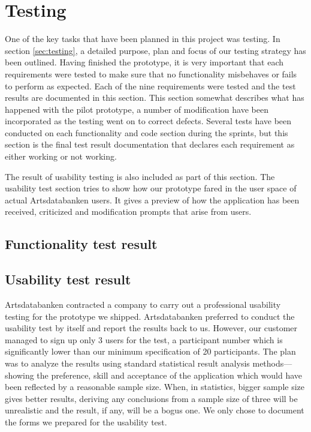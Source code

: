 \section{Testing}
\label{sec:testresult}

One of the key tasks that have been planned in this project was testing. In
section \ref{sec:testing}, a detailed purpose, plan and focus of our testing
strategy has been outlined. Having finished the prototype, it is very important
that each requirements were tested to make sure that no functionality
misbehaves or fails to perform as expected. Each of the nine requirements were
tested and the test results are documented in this section. This section
somewhat describes what has happened with the pilot prototype, a number of
modification have been incorporated as the testing went on to correct defects.
Several tests have been conducted on each functionality and code section during
the sprints, but this section is the final test result documentation that
declares each requirement as either working or not working.

The result of usability testing is also included as part of this section. The
usability test section tries to show how our prototype fared in the user space
of actual Artsdatabanken users. It gives a preview of how the application has
been received, criticized and modification prompts that arise from users.

\subsection{Functionality test result}






\subsection{Usability test result}

Artsdatabanken contracted a company to carry out a professional usability
testing for the prototype we shipped. Artsdatabanken preferred to conduct the
usability test by itself and report the results back to us. However, our
customer managed to sign up only 3 users for the test, a participant number
which is significantly lower than our minimum specification of 20 participants.
The plan was to analyze the results using standard statistical result analysis
methods---showing the preference, skill and acceptance of the application which
would have been reflected by a reasonable sample size. When, in statistics,
bigger sample size gives better results\cite{statistics}, deriving any
conclusions from a sample size of three will be unrealistic and the result, if
any, will be a bogus one. We only chose to document the forms we prepared for
the usability test.

